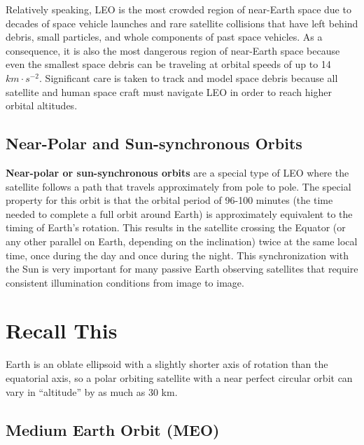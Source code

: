 \documentclass[
]{book}
\begin{document}
Relatively speaking, LEO is the most crowded region of near-Earth space due to decades of space vehicle launches and rare satellite collisions that have left behind debris, small particles, and whole components of past space vehicles. As a consequence, it is also the most dangerous region of near-Earth space because even the smallest space debris can be traveling at orbital speeds of up to 14 \(km·s^{-2}\). Significant care is taken to track and model space debris because all satellite and human space craft must navigate LEO in order to reach higher orbital altitudes.

\hypertarget{near-polar-and-sun-synchronous-orbits}{%
\subsection{Near-Polar and Sun-synchronous Orbits}\label{near-polar-and-sun-synchronous-orbits}}

\textbf{Near-polar or sun-synchronous orbits} are a special type of LEO where the satellite follows a path that travels approximately from pole to pole. The special property for this orbit is that the orbital period of 96-100 minutes (the time needed to complete a full orbit around Earth) is approximately equivalent to the timing of Earth's rotation. This results in the satellite crossing the Equator (or any other parallel on Earth, depending on the inclination) twice at the same local time, once during the day and once during the night. This synchronization with the Sun is very important for many passive Earth observing satellites that require consistent illumination conditions from image to image.

\hypertarget{recall-this-2}{%
\section*{Recall This}\label{recall-this-2}}

Earth is an oblate ellipsoid with a slightly shorter axis of rotation than the equatorial axis, so a polar orbiting satellite with a near perfect circular orbit can vary in ``altitude'' by as much as 30 km.

\hypertarget{medium-earth-orbit-meo}{%
\subsection{Medium Earth Orbit (MEO)}\label{medium-earth-orbit-meo}}
\end{document}

